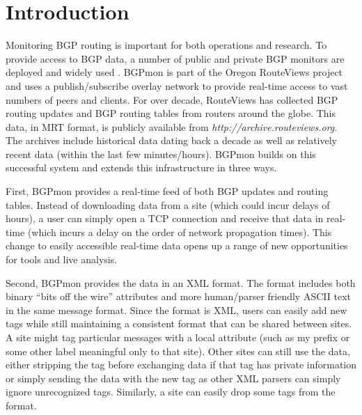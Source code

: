 \section{Introduction}
\label{sec:intro}

Monitoring BGP\cite{bgp} routing is important for both operations and research.   To provide access to BGP data,  a number of public and private BGP monitors are deployed and widely used \cite{routeviews,riperis}.    BGPmon is part of the Oregon RouteViews project\cite{routeviews} and uses a publish/subscribe overlay network to provide real-time access to vast numbers of peers and clients.   For over decade,  RouteViews has collected BGP routing updates and BGP routing tables from routers around the globe.    This data, in MRT format\cite{mrt},  is publicly available from \emph{http://archive.routeviews.org}.   The archives include historical data dating back a decade as well as relatively recent data (within the last few minutes/hours).      BGPmon builds on this successful system and extends this infrastructure in three ways.   

First,  BGPmon provides a real-time feed of both BGP updates and routing tables.    Instead of downloading data from a site (which could incur delays of hours),   a user can simply open a TCP connection and receive that data in real-time (which incurs a delay on the order of network propagation times).     This change to easily accessible real-time data opens up a range of new opportunities for tools and live analysis.    

Second, BGPmon provides the data in an XML format.   The format includes both binary ``bits off the wire'' attributes and more human/parser friendly ASCII text in the same message format.    Since the format is XML,  users can easily add new tags while still maintaining a consistent format that can be shared between sites.  A site might tag particular messages with a local attribute (such as my prefix or some other label meaningful only to that site).    Other sites can still use the data,  either stripping the tag before exchanging data if that tag has private information or simply sending the data with the new tag as other XML parsers can simply ignore unrecognized tags.      Similarly,   a site can easily drop some tags from the format.  

